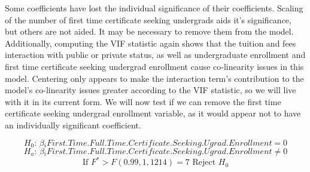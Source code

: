 \documentclass{article}
\begin{document}
\begin{table}[ht]
\caption{F = 357.8953 (n = 1351 on 1214 degrees of freedom)} 
\end{table}
\FloatBarrier

Some coefficients have lost the individual significance of their coefficients. Scaling of the number of first time certificate seeking undergrads aids it's significance, but others are not aided. It may be necessary to remove them from the model. Additionally, computing the VIF statistic again shows that the tuition and fees interaction with public or private status, as well as undergraduate enrollment and first time certificate seeking undergrad enrollment cause co-linearity issues in this model. Centering only appears to make the interaction term's contribution to the model's co-linearity issues greater according to the VIF statistic, so we will live with it in its current form. We will now test if we can remove the first time certificate seeking undergrad enrollment variable, as it would appear not to have an individually significant coefficient.

$$ H_0 \text{: } \beta{}_iFirst.Time.Full.Time.Certificate.Seeking.Ugrad.Enrollment = 0 $$
$$ H_a \text{: } \beta{}_iFirst.Time.Full.Time.Certificate.Seeking.Ugrad.Enrollment  $$
$$  F^* > F(0.99,1,1214) = 7 H_0 $$
\end{document}
